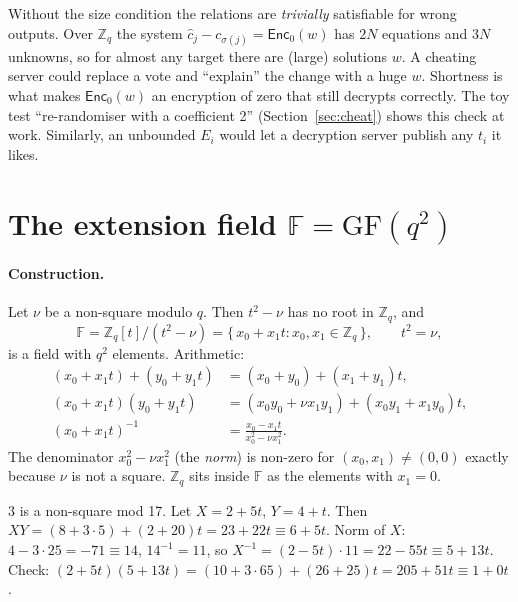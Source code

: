 \documentclass[11pt,a4paper]{article}
\newcommand{\Z}{\mathbb{Z}}
\newcommand{\Zq}{\mathbb{Z}_q}
\newcommand{\F}{\mathbb{F}}
\newcommand{\EncZ}{\mathsf{Enc}_0}
\newcommand{\ch}{\hat{c}}
\theoremstyle{definition}
\theoremstyle{plain}
\begin{document}
\begin{why}
Without the size condition the relations are \emph{trivially} satisfiable for wrong outputs. Over
$\Zq$ the system $\ch_j-c_{\sigma(j)}=\EncZ(w)$ has $2N$ equations and $3N$ unknowns, so for almost
any target there are (large) solutions $w$. A cheating server could replace a vote and ``explain'' the
change with a huge $w$. Shortness is what makes $\EncZ(w)$ an encryption of zero that still
decrypts correctly. The toy test ``re-randomiser with a coefficient 2'' (Section~\ref{sec:cheat})
shows this check at work. Similarly, an unbounded $E_i$ would let a decryption server publish any
$t_i$ it likes.
\end{why}

\section{The extension field $\F=\mathrm{GF}(q^2)$}
\label{sec:field}

\paragraph{Construction.} Let $\nu$ be a non-square modulo $q$. Then $t^2-\nu$ has no root in $\Zq$,
and
\[
  \F=\Zq[t]/(t^2-\nu)=\{\,x_0+x_1t : x_0,x_1\in\Zq\,\},\qquad t^2=\nu,
\]
is a field with $q^2$ elements. Arithmetic:
\begin{align*}
(x_0+x_1t)+(y_0+y_1t)&=(x_0+y_0)+(x_1+y_1)t,\\
(x_0+x_1t)(y_0+y_1t)&=(x_0y_0+\nu x_1y_1)+(x_0y_1+x_1y_0)t,\\
(x_0+x_1t)^{-1}&=\frac{x_0-x_1t}{x_0^2-\nu x_1^2}.
\end{align*}
The denominator $x_0^2-\nu x_1^2$ (the \emph{norm}) is non-zero for $(x_0,x_1)\neq(0,0)$ exactly because
$\nu$ is not a square. $\Zq$ sits inside $\F$ as the elements with $x_1=0$.

\begin{example}[{$\mathrm{GF}(17^2)=\Z_{17}[t]/(t^2-3)$}]
$3$ is a non-square mod 17. Let $X=2+5t$, $Y=4+t$. Then
$XY=(8+3\cdot 5)+(2+20)t=23+22t\equiv 6+5t$.
Norm of $X$: $4-3\cdot 25=-71\equiv 14$, $14^{-1}=11$, so
$X^{-1}=(2-5t)\cdot 11=22-55t\equiv 5+13t$. Check: $(2+5t)(5+13t)=(10+3\cdot 65)+(26+25)t=205+51t\equiv 1+0t$.
\end{example}
\end{document}
